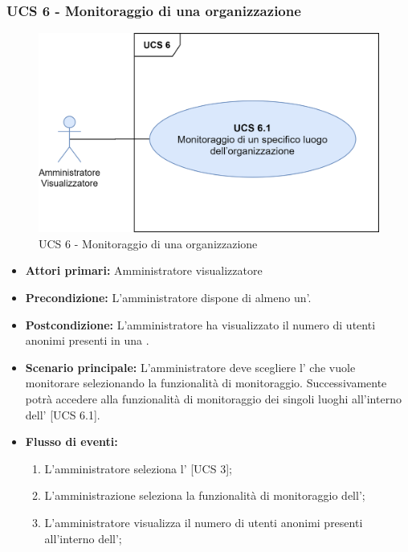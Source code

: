\subsubsection{UCS 6 - Monitoraggio di una organizzazione}

\begin{figure}[h]
	\centering
    \includegraphics[scale=0.50]{Sezioni/UseCase/Immagini/UCS6.png}
    \caption{UCS 6 - Monitoraggio di una organizzazione}
\end{figure}

\begin{itemize}
	\item \textbf{Attori primari:} Amministratore visualizzatore
	\item \textbf{Precondizione:} L'amministratore dispone di almeno un'.
	\item \textbf{Postcondizione:} L'amministratore ha visualizzato il numero di utenti anonimi presenti in una .
	\item \textbf{Scenario principale:} L'amministratore deve scegliere l' che vuole monitorare selezionando la funzionalità di monitoraggio. Successivamente potrà accedere alla funzionalità di monitoraggio dei singoli luoghi all'interno dell' [UCS 6.1].
	\item \textbf{Flusso di eventi:}
\begin{enumerate}
	\item L'amministratore seleziona l' [UCS 3]; 
	\item L'amministrazione seleziona la funzionalità di monitoraggio dell';
	\item L'amministratore visualizza il numero di utenti anonimi presenti all'interno dell';
\end{enumerate}
\end{itemize}

